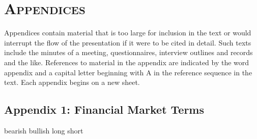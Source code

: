 %
%
% 
% 
% 

\chapter{\textsc{Appendices}}
\label{chap:app}

Appendices contain material that is too large for inclusion in the text or would interrupt the flow of the presentation if it were to be cited in detail. Such texts include the minutes of a meeting, questionnaires, interview outlines and records and the like. References to material in the appendix are indicated by the word appendix and a capital letter beginning with A in the reference sequence in the text. Each appendix begins on a new sheet.

\clearpage

\section{Appendix 1: Financial Market Terms}
bearish
bullish
long
short
